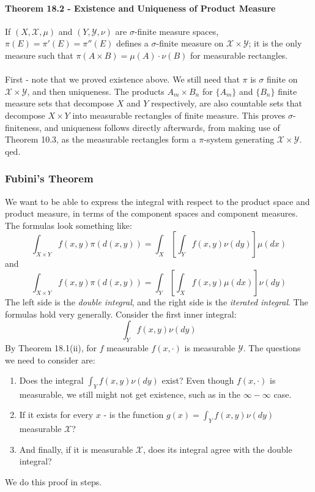 \documentclass[12pt,a4paper]{article}
\newcommand{\1}[1]{\mathbbm{1}\left\{ #1 \right\}}
\newcommand{\xcal}{\mathcal{X}}
\newcommand{\ycal}{\mathcal{Y}}
\begin{document}
\paragraph{Theorem 18.2 - Existence and Uniqueness of Product Measure} If $(X, \xcal, \mu)$ and $(Y, \ycal, \nu)$ are $\sigma$-finite measure spaces, $\pi(E) = \pi'(E) = \pi''(E)$ defines a $\sigma$-finite measure on $\xcal \times \ycal$; it is the only measure such that $\pi(A \times B) = \mu(A) \cdot \nu(B)$ for measurable rectangles.
\\\\
First - note that we proved existence above. We still need that $\pi$ is $\sigma$ finite on $\xcal \times \ycal$, and then uniqueness. The products $A_m \times B_n$ for $\{A_m\}$ and $\{B_n\}$ finite measure sets that decompose $X$ and $Y$ respectively, are also countable sets that decompose $X \times Y$ into measurable rectangles of finite measure. This proves $\sigma$-finiteness, and uniqueness follows directly afterwards, from making use of Theorem 10.3, as the measurable rectangles form a $\pi$-system generating $\xcal \times \ycal$. qed.

\subsubsection{Fubini's Theorem} We want to be able to express the integral with respect to the product space and product measure, in terms of the component spaces and component measures. The formulas look something like:
$$
	\int_{X \times Y} f(x,y) \pi(d(x,y)) = \int_X \left[\int_Y f(x,y) \nu(dy)\right] \mu(dx)
$$
and
$$
	\int_{X \times Y} f(x,y) \pi(d(x,y)) = \int_Y \left[\int_X f(x,y) \mu(dx)\right] \nu(dy)
$$
The left side is the \textit{double integral}, and the right side is the \textit{iterated integral}. The formulas hold very generally. Consider the first inner integral:
$$
	\int_Y f(x,y) \nu(dy)
$$
By Theorem 18.1(ii), for $f$ measurable $f(x,\cdot)$ is measurable $\ycal$. The questions we need to consider are:
\begin{enumerate}
	\item Does the integral $\int_Y f(x,y) \nu(dy)$ exist? Even though $f(x,\cdot)$ is measurable, we still might not get existence, such as in the $\infty - \infty$ case.
	
	\item If it exists for every $x$ - is the function $g(x) = \int_Y f(x,y) \nu(dy)$ measurable $\xcal$?
	
	\item And finally, if it is measurable $\xcal$, does its integral agree with the double integral?
\end{enumerate}
We do this proof in steps.
\end{document}
